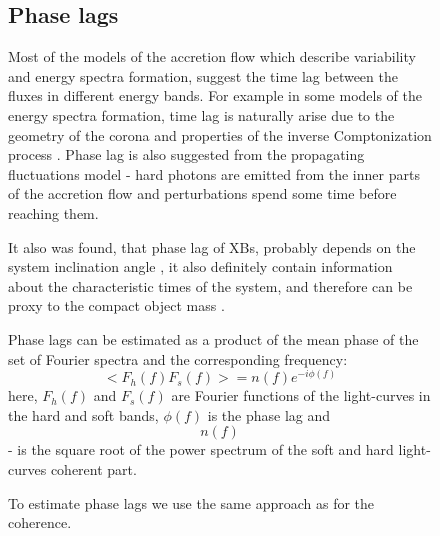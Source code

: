\begin{figure}


\subsection{Phase lags}
    Most of the models of the accretion flow which describe variability and energy spectra formation, suggest the time lag between the fluxes in different energy bands. 
For example in some models of the energy spectra formation, time lag is naturally arise due to the geometry of the corona and properties of the inverse Comptonization process \citep[see, e.g.][]{kotov01}.
Phase lag is also suggested from the propagating fluctuations model - hard photons are emitted from the inner parts of the accretion flow and perturbations spend some time before reaching them. 

It also was found, that phase lag of XBs, probably depends on the system inclination angle \citep{eijeden17}, it also definitely contain information about the characteristic times of the system, and therefore can be proxy to the compact object mass \citep{}. 

Phase lags can be estimated as a product of the mean phase of the set of Fourier spectra and the corresponding frequency:
$$<F_h(f)F_s(f)> = n(f)e^{-i\phi(f)}$$ 
here, $F_h(f)$ and $F_s(f)$ are Fourier functions of the light-curves in the hard and soft bands, $\phi(f)$ is the phase lag and $$n(f)$$ - is the square root of the power spectrum of the soft and hard light-curves coherent part. 

To estimate phase lags we use the same approach as for the coherence.




\end{figure}
